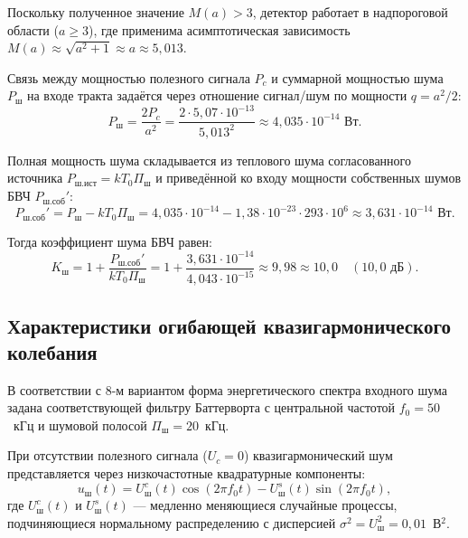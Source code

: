 Поскольку полученное значение $M(a) > 3$, детектор работает в надпороговой области ($a \ge 3$), где применима асимптотическая зависимость $M(a) \approx \sqrt{a^2 + 1} \approx a \approx 5{,}013$.

Связь между мощностью полезного сигнала $P_c$ и суммарной мощностью шума $P_{\text{ш}}$ на входе тракта задаётся через отношение сигнал/шум по мощности $q = a^2 / 2$:
\begin{equation}
    P_{\text{ш}} = \frac{2 P_c}{a^2} = \frac{2 \cdot 5{,}07 \cdot 10^{-13}}{5{,}013^2} \approx 4{,}035 \cdot 10^{-14}\text{ Вт}.
\end{equation}

Полная мощность шума складывается из теплового шума согласованного источника $P_{\text{ш.ист}} = k T_0 \Pi_{\text{ш}}$ и приведённой ко входу мощности собственных шумов БВЧ $P_{\text{ш.соб}}'$:
\begin{equation}
    P_{\text{ш.соб}}' = P_{\text{ш}} - k T_0 \Pi_{\text{ш}} = 4{,}035 \cdot 10^{-14} - 1{,}38 \cdot 10^{-23} \cdot 293 \cdot 10^6 \approx 3{,}631 \cdot 10^{-14}\text{ Вт}.
\end{equation}

Тогда коэффициент шума БВЧ равен:
\begin{equation}
    K_{\text{ш}} = 1 + \frac{P_{\text{ш.соб}}'}{k T_0 \Pi_{\text{ш}}} = 1 + \frac{3{,}631 \cdot 10^{-14}}{4{,}043 \cdot 10^{-15}} \approx 9{,}98 \approx 10{,}0 \quad (10{,}0\text{ дБ}).
\end{equation}

\subsection{Характеристики огибающей квазигармонического колебания}

В соответствии с 8-м вариантом форма энергетического спектра входного шума задана соответствующей фильтру Баттерворта с центральной частотой $f_0 = 50$~кГц и шумовой полосой $\Pi_{\text{ш}} = 20$~кГц.

При отсутствии полезного сигнала ($U_c = 0$) квазигармонический шум представляется через низкочастотные квадратурные компоненты:
\begin{equation}
    u_{\text{ш}}(t) = U_{\text{ш}}^c(t) \cos(2\pi f_0 t) - U_{\text{ш}}^s(t) \sin(2\pi f_0 t),
\end{equation}
где $U_{\text{ш}}^c(t)$ и $U_{\text{ш}}^s(t)$ — медленно меняющиеся случайные процессы, подчиняющиеся нормальному распределению с дисперсией $\sigma^2 = U_{\text{ш}}^2 = 0{,}01$~В$^2$.

